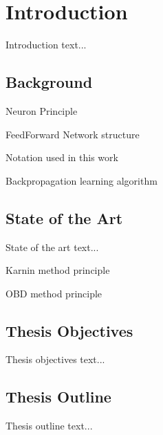 \chapter{Introduction} \label{chap:introduction}
Introduction text...

\section{Background} \label{sec:background}
Neuron Principle

FeedForward Network structure

Notation used in this work

Backpropagation learning algorithm

\citep{article:perceptron}

\section{State of the Art} \label{sec:state_of_the_art}
State of the art text...  \citep{article:pruning_algorithms}

Karnin method principle

OBD method principle

\section{Thesis Objectives} \label{sec:thesis_objectives}
Thesis objectives text...

\section{Thesis Outline} \label{sec:thesis_outline}
Thesis outline text...